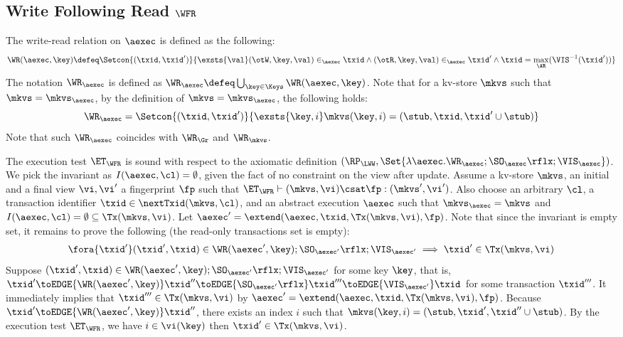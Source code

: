 \subsection{Write Following Read \( \WFR \) }
\label{sec:sound-complete-wfr}

The write-read relation  on \( \aexec \) is defined as the following:
\[
\WR(\aexec, \key) \defeq \Setcon{ (\txid, \txid') }{ \exsts{\val} (\otW, \key, \val) \in_\aexec \txid \land (\otR, \key, \val) \in_\aexec \txid' \land \txid = \max_\AR(\VIS^{-1}(\txid')) }
\]
The notation \( \WR_\aexec \) is defined as \( \WR_\aexec \defeq \bigcup_{\key \in \Keys} \WR(\aexec, \key) \).
Note that for a kv-store \( \mkvs \) such that \( \mkvs = \mkvs_\aexec \),
by the definition of  \(  \mkvs = \mkvs_\aexec \), 
the following holds:
\[
    \WR_\aexec = \Setcon{(\txid, \txid')}{\exsts{\key, i } \mkvs(\key, i) = (\stub, \txid, \txid'\cup \stub)}
\]
Note that such \( \WR_\aexec \) coincides with \( \WR_\Gr \) and \( \WR_\mkvs \).

The execution test $\ET_\WFR$ is sound with respect to the axiomatic definition 
\( (\RP_{\LWW}, \Set{\lambda \aexec. \WR_\aexec ; \SO_{\aexec}\rflx ; \VIS_{\aexec} })\).
We pick the invariant as \( I( \aexec, \cl ) = \emptyset \), given the fact of no constraint on the view after update.
Assume a kv-store $\mkvs$, an initial and a final view $\vi, \vi'$  a fingerprint $\fp$ 
such that $\ET_{\WFR} \vdash (\mkvs, \vi) \csat \fp: (\mkvs', \vi')$. 
Also choose an arbitrary $\cl$, a transaction identifier $\txid \in \nextTxid(\mkvs, \cl)$, 
and an abstract execution $\aexec$ such that $\mkvs_{\aexec} = \mkvs$ and 
\( I(\aexec, \cl) =  \emptyset \subseteq \Tx(\mkvs, \vi) \).
Let \( \aexec' = \extend(\aexec, \txid, \Tx(\mkvs, \vi) , \fp ) \).
Note that since the invariant is empty set, it remains to prove the following (the read-only transactions set is empty):
\[
    \begin{array}{@{}l@{}}
        \fora{ \txid' } 
        (\txid' ,\txid)  \in \WR(\aexec',\key) ; \SO_{\aexec'}\rflx ; \VIS_{\aexec'} 
        \implies \txid' \in \Tx(\mkvs, \vi) 
    \end{array}
\]
Suppose \( (\txid' ,\txid)  \in \WR(\aexec', \key) ; \SO_{\aexec'}\rflx ; \VIS_{\aexec'} \) for some key \( \key \),
that is, \( \txid' \toEDGE{\WR(\aexec', \key)} \txid'' \toEDGE{\SO_{\aexec'}\rflx} \txid''' \toEDGE{\VIS_{\aexec'}} \txid \) for some transaction \( \txid''' \).
It immediately implies that \( \txid''' \in \Tx(\mkvs, \vi)  \) by \( \aexec' = \extend(\aexec, \txid, \Tx(\mkvs, \vi) , \fp ) \).
Because \( \txid' \toEDGE{\WR(\aexec', \key)} \txid'' \), there exists an index \( i \) such that \( \mkvs(\key, i) = (\stub, \txid', \txid'' \cup \stub) \).
By the execution test \( \ET_\WFR \), we have \( i \in \vi( \key ) \) then \( \txid' \in \Tx(\mkvs, \vi ) \).



